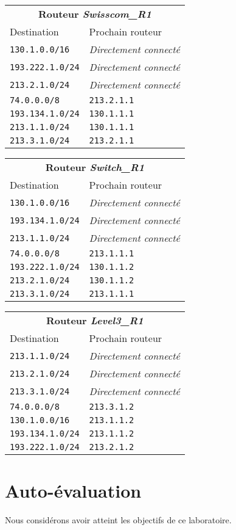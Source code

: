 \documentclass[11pt,a4paper]{article}
\begin{document}
\begin{tabular}{|ll|}
	\hline
	\multicolumn{2}{|c|}{\textbf{Routeur \textit{Swisscom\_R1}}} \\
	Destination & Prochain routeur \\
	\hline
	\texttt{130.1.0.0/16} & \textit{Directement connecté} \\
	\texttt{193.222.1.0/24} & \textit{Directement connecté} \\
	\texttt{213.2.1.0/24} & \textit{Directement connecté} \\
	\texttt{74.0.0.0/8} & \texttt{213.2.1.1} \\
	\texttt{193.134.1.0/24} & \texttt{130.1.1.1} \\
	\texttt{213.1.1.0/24} & \texttt{130.1.1.1} \\
	\texttt{213.3.1.0/24} & \texttt{213.2.1.1} \\
	\hline
\end{tabular}
\quad
\begin{tabular}{|ll|}
	\hline
	\multicolumn{2}{|c|}{\textbf{Routeur \textit{Switch\_R1}}} \\
	Destination & Prochain routeur \\
	\hline
	\texttt{130.1.0.0/16} & \textit{Directement connecté} \\
	\texttt{193.134.1.0/24} & \textit{Directement connecté} \\
	\texttt{213.1.1.0/24} & \textit{Directement connecté} \\
	\texttt{74.0.0.0/8} & \texttt{213.1.1.1} \\
	\texttt{193.222.1.0/24} & \texttt{130.1.1.2} \\
	\texttt{213.2.1.0/24} & \texttt{130.1.1.2} \\
	\texttt{213.3.1.0/24} & \texttt{213.1.1.1} \\
	\hline
\end{tabular}

\begin{tabular}{|ll|}
	\hline
	\multicolumn{2}{|c|}{\textbf{Routeur \textit{Level3\_R1}}} \\
	Destination & Prochain routeur \\
	\hline
	\texttt{213.1.1.0/24} & \textit{Directement connecté} \\
	\texttt{213.2.1.0/24} & \textit{Directement connecté} \\
	\texttt{213.3.1.0/24} & \textit{Directement connecté} \\
	\texttt{74.0.0.0/8} & \texttt{213.3.1.2} \\
	\texttt{130.1.0.0/16} & \texttt{213.1.1.2} \\
	\texttt{193.134.1.0/24} & \texttt{213.1.1.2} \\
	\texttt{193.222.1.0/24} & \texttt{213.2.1.2} \\
	\hline
\end{tabular}

\section{Auto-évaluation}

Nous considérons avoir atteint les objectifs de ce laboratoire.
\end{document}
